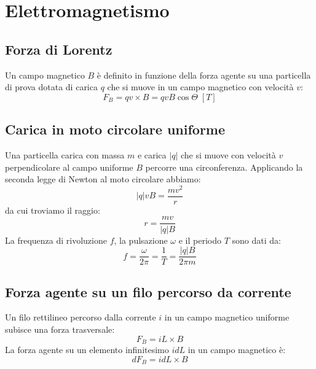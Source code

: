 \chapter{Elettromagnetismo}

    \section{Forza di Lorentz} Un campo magnetico $B$ è definito in funzione 
    della forza agente su una particella di prova dotata di carica $q$ che si 
    muove in un campo magnetico con velocità $v$:
        \begin{equation}
            F_B = qv \times B = qvB\cos\Theta \; [T]
        \end{equation}

    \section{Carica in moto circolare uniforme} Una particella carica con massa
    $m$ e carica $|q|$ che si muove con velocità $v$ perpendicolare al campo
    uniforme $B$ percorre una circonferenza. Applicando la seconda legge di 
    Newton al moto circolare abbiamo:
        \begin{equation*}
            |q|vB = \frac{mv^2}{r}
        \end{equation*}
    da cui troviamo il raggio:
        \begin{equation*}
            r = \frac{mv}{|q|B}
        \end{equation*}
    La frequenza di rivoluzione $f$, la pulsazione $\omega$ e il periodo $T$
    sono dati da:
        \begin{equation}
            f = \frac{\omega}{2\pi} = \frac{1}{T} = \frac{|q|B}{2\pi m}
        \end{equation}

    \section{Forza agente su un filo percorso da corrente} Un filo rettilineo
    percorso dalla corrente $i$ in un campo magnetico uniforme subisce una 
    forza trasversale:
        \begin{equation}
            F_B = iL\times B
        \end{equation}
    La forza agente su un elemento infinitesimo $idL$ in un campo magnetico è:
        \begin{equation}
            dF_B = idL\times B
        \end{equation}

